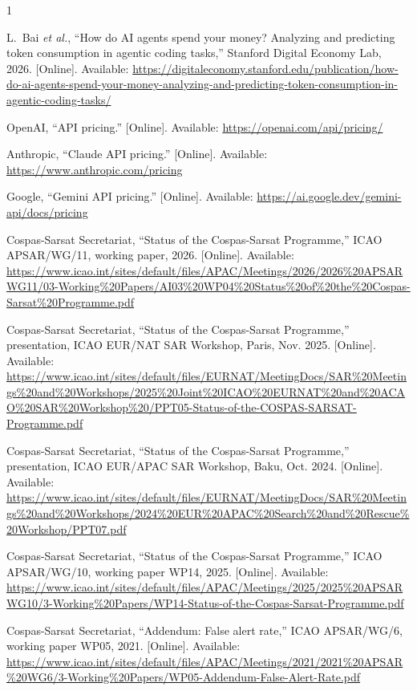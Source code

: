 \documentclass[conference]{IEEEtran}
\begin{document}
\begin{thebibliography}{1}

L.~Bai \emph{et al.}, ``How do AI agents spend your money? Analyzing and predicting token consumption in agentic coding tasks,'' Stanford Digital Economy Lab, 2026. [Online]. Available: \url{https://digitaleconomy.stanford.edu/publication/how-do-ai-agents-spend-your-money-analyzing-and-predicting-token-consumption-in-agentic-coding-tasks/}

OpenAI, ``API pricing.'' [Online]. Available: \url{https://openai.com/api/pricing/}

Anthropic, ``Claude API pricing.'' [Online]. Available: \url{https://www.anthropic.com/pricing}

Google, ``Gemini API pricing.'' [Online]. Available: \url{https://ai.google.dev/gemini-api/docs/pricing}

Cospas-Sarsat Secretariat, ``Status of the Cospas-Sarsat Programme,'' ICAO APSAR/WG/11, working paper, 2026. [Online]. Available: \url{https://www.icao.int/sites/default/files/APAC/Meetings/2026/2026%20APSARWG11/03-Working%20Papers/AI03%20WP04%20Status%20of%20the%20Cospas-Sarsat%20Programme.pdf}

Cospas-Sarsat Secretariat, ``Status of the Cospas-Sarsat Programme,'' presentation, ICAO EUR/NAT SAR Workshop, Paris, Nov. 2025. [Online]. Available: \url{https://www.icao.int/sites/default/files/EURNAT/MeetingDocs/SAR%20Meetings%20and%20Workshops/2025%20Joint%20ICAO%20EURNAT%20and%20ACAO%20SAR%20Workshop%20/PPT05-Status-of-the-COSPAS-SARSAT-Programme.pdf}

Cospas-Sarsat Secretariat, ``Status of the Cospas-Sarsat Programme,'' presentation, ICAO EUR/APAC SAR Workshop, Baku, Oct. 2024. [Online]. Available: \url{https://www.icao.int/sites/default/files/EURNAT/MeetingDocs/SAR%20Meetings%20and%20Workshops/2024%20EUR%20APAC%20Search%20and%20Rescue%20Workshop/PPT07.pdf}

Cospas-Sarsat Secretariat, ``Status of the Cospas-Sarsat Programme,'' ICAO APSAR/WG/10, working paper WP14, 2025. [Online]. Available: \url{https://www.icao.int/sites/default/files/APAC/Meetings/2025/2025%20APSARWG10/3-Working%20Papers/WP14-Status-of-the-Cospas-Sarsat-Programme.pdf}

Cospas-Sarsat Secretariat, ``Addendum: False alert rate,'' ICAO APSAR/WG/6, working paper WP05, 2021. [Online]. Available: \url{https://www.icao.int/sites/default/files/APAC/Meetings/2021/2021%20APSAR%20WG6/3-Working%20Papers/WP05-Addendum-False-Alert-Rate.pdf}


\end{thebibliography}
\end{document}
